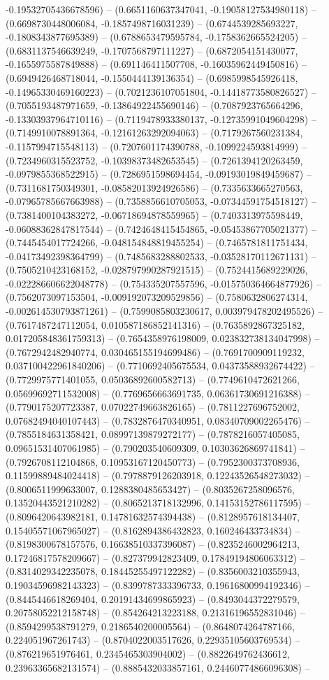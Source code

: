 -0.19532705436678596) -- (0.6651160637347041, -0.19058127534980118) -- (0.6698730448006084, -0.1857498716031239) -- (0.6744539285693227, -0.1808343877695389) -- (0.6788653479595784, -0.1758362665524205) -- (0.6831137546639249, -0.1707568797111227) -- (0.6872054151430077, -0.1655975587849888) -- (0.691146411507708, -0.16035962449450816) -- (0.6949426468718044, -0.1550444139136354) -- (0.6985998545926418, -0.14965330469160223) -- (0.7021236107051804, -0.14418773580826527) -- (0.7055193487971659, -0.13864922455690146) -- (0.7087923765664296, -0.13303937964710116) -- (0.7119478933380137, -0.12735991049604298) -- (0.7149910078891364, -0.12161263292094063) -- (0.7179267560231384, -0.1157994715548113) -- (0.7207601174390788, -0.1099224593814999) -- (0.7234960315523752, -0.10398373482653545) -- (0.7261394120263459, -0.0979855368522915) -- (0.7286951598694454, -0.09193019849459687) -- (0.7311681750349301, -0.08582013924926586) -- (0.7335633665270563, -0.07965785667663988) -- (0.7358856610705053, -0.07344591754518127) -- (0.7381400104383272, -0.06718694878559965) -- (0.7403313975598449, -0.06088362847817544) -- (0.7424648415454865, -0.05453867705021377) -- (0.7445454017724266, -0.048154848819455254) -- (0.7465781811751434, -0.04173492398364799) -- (0.7485683288802533, -0.03528170112671131) -- (0.7505210423168152, -0.028797990287921515) -- (0.7524415689229026, -0.022286606622048778) -- (0.754335207557596, -0.015750364664877926) -- (0.7562073097153504, -0.009192073209529856) -- (0.7580632806274314, -0.002614530793871261) -- (0.7599085803230617, 0.003979478202495526) -- (0.7617487247112054, 0.010587186852141316) -- (0.7635892867325182, 0.017205848361759313) -- (0.7654358976198009, 0.023832738134047998) -- (0.7672942482940774, 0.030465155194699486) -- (0.7691700909119232, 0.037100422961840206) -- (0.7710692405675534, 0.04373588932674422) -- (0.7729975771401055, 0.05036892600582713) -- (0.7749610472621266, 0.05699692711532008) -- (0.7769656663691735, 0.06361730691216388) -- (0.7790175207723387, 0.07022749663826165) -- (0.7811227696752002, 0.07682494040107443) -- (0.7832876470340951, 0.08340709002265476) -- (0.7855184631358421, 0.08997139879272177) -- (0.7878216057405085, 0.09651531407061985) -- (0.790203540609309, 0.10303626869741841) -- (0.7926708112104868, 0.10953167120450773) -- (0.7952300373708936, 0.11599889484024418) -- (0.7978879126203918, 0.12243526548273032) -- (0.8006511999633007, 0.1288380485653427) -- (0.8035267258096576, 0.13520443521210282) -- (0.8065213718132996, 0.14153152786117595) -- (0.8096420643982181, 0.14781632574394438) -- (0.8128957618134407, 0.15405571067965027) -- (0.8162894386432823, 0.160246433734834) -- (0.8198300678157576, 0.16638510337396087) -- (0.8235246002964213, 0.17246817578209667) -- (0.827379942823409, 0.17849194806063312) -- (0.8314029342235078, 0.18445255497122282) -- (0.8356003210355943, 0.19034596982143323) -- (0.8399787333396733, 0.19616800994192346) -- (0.8445446618269404, 0.20191434699865923) -- (0.8493044372279579, 0.20758052212158748) -- (0.854264213223188, 0.21316196552831046) -- (0.8594299538791279, 0.2186540200005564) -- (0.8648074264787166, 0.224051967261743) -- (0.8704022003517626, 0.22935105603769534) -- (0.876219651976461, 0.2345465303904002) -- (0.8822649762436612, 0.23963365682131574) -- (0.8885432033857161, 0.24460774866096308) -- 